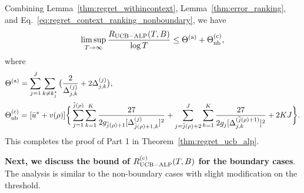 Combining Lemma~\ref{thm:regret_withincontext}, Lemma~\ref{thm:error_ranking}, and Eq.~\eqref{eq:regret_context_ranking_nonboundary}, we have
\begin{eqnarray}
\limsup_{T\to \infty} \frac{R_{\rm{UCB-ALP}}(T, B)}{\log T} \leq \Theta^{\rm (a)} + \Theta^{\rm (c)}_{\rm nb}, \nonumber
\end{eqnarray}
where
\begin{align}
&\Theta^{\rm (a)} = \sum_{j=1}^J \sum_{k \neq k_j^*} \big(\frac{2}{\Delta_{j,k}^{(j)}} + 2\Delta_{j,k}^{(j)}\big),\nonumber\\
&\Theta^{\rm (c)}_{\rm nb} = [\bar{u}^* + v(\rho)]\bigg\{\sum_{j = 1}^{\tilde{j}(\rho)}\sum_{k=1}^K\frac{27}{2g_{\tilde{j}(\rho)+1} [\Delta^{(j)}_{\tilde{j}(\rho)+1,k}]^2} + \sum_{j =\tilde{j}(\rho)+2}^{J}\sum_{k=1}^K\frac{27}{2g_j [\Delta^{(\tilde{j}(\rho)+1)}_{j,k}]^2} + 2KJ \bigg\}.\nonumber
\end{align}
This completes the proof of Part 1 in Theorem~\ref{thm:regret_ucb_alp}.

\textbf{Next, we discuss the bound of $R_{\rm {UCB-ALP}}^{({\rm c})}(T, B)$ for the boundary cases}. The analysis is similar to  the non-boundary cases with slight modification on the threshold.

